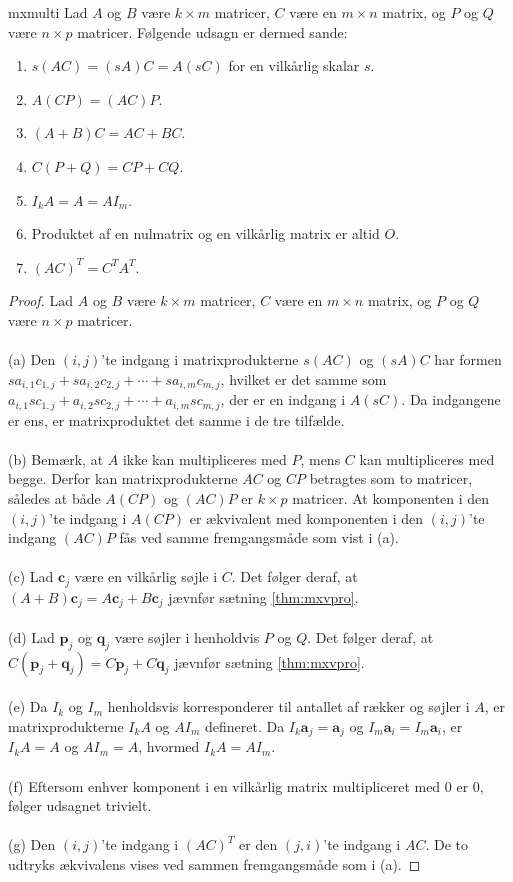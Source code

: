 \begin{thm}{}{mxmulti}
Lad $A$ og $B$ være $k \times m$ matricer, $C$ være en $m \times n$ matrix, og $P$ og $Q$ være $n \times p$ matricer. Følgende udsagn er dermed sande:
\begin{enumerate}[label=(\alph*)]
\item $s(AC)=(sA)C=A(sC)$ for en vilkårlig skalar $s$.
\item $A(CP)=(AC)P$.
\item $(A+B)C=AC+BC$.
\item $C(P+Q)=CP+CQ$.
\item $I_kA=A=AI_m$.
\item Produktet af en nulmatrix og en vilkårlig matrix er altid $O$.
\item $(AC)^T=C^TA^T$.
\end{enumerate}
\end{thm}
\begin{proof}
Lad $A$ og $B$ være $k \times m$ matricer, $C$ være en $m \times n$ matrix, og $P$ og $Q$ være $n \times p$ matricer. 
\\\\
(a) Den $(i,j)$'te indgang i matrixprodukterne $s(AC)$ og $(sA)C$ har formen $sa_{i,1}c_{1,j} + sa_{i,2}c_{2,j} + \cdots + sa_{i,m}c_{m,j}$, hvilket er det samme som $a_{i,1}sc_{1,j} + a_{i,2}sc_{2,j} + \cdots + a_{i,m}sc_{m,j}$, der er en indgang i $A(sC)$. 
Da indgangene er ens, er matrixproduktet det samme i de tre tilfælde.
\\\\
(b) Bemærk, at $A$ ikke kan multipliceres med $P$, mens $C$ kan multipliceres med begge. 
Derfor kan matrixprodukterne $AC$ og $CP$ betragtes som to matricer, således at både $A(CP)$ og $(AC)P$ er $k \times p$ matricer. 
At komponenten i den $(i,j)$'te indgang i $A(CP)$ er ækvivalent med komponenten i den $(i,j)$'te indgang $(AC)P$ fås ved samme fremgangsmåde som vist i (a). 
\\\\
(c) Lad $\textbf{c}_j$ være en vilkårlig søjle i $C$. 
Det følger deraf, at $(A+B)\textbf{c}_j=A\textbf{c}_j+B\textbf{c}_j$ jævnfør sætning \ref{thm:mxvpro}. 
\\\\
(d) Lad $\textbf{p}_j$ og $\textbf{q}_j$ være søjler i henholdvis $P$ og $Q$. Det følger deraf, at $C(\textbf{p}_j+\textbf{q}_j)=C\textbf{p}_j+C\textbf{q}_j$ jævnfør sætning \ref{thm:mxvpro}. 
\\\\
(e) Da $I_k$ og $I_m$ henholdsvis korresponderer til antallet af rækker og søjler i $A$, er matrixprodukterne $I_kA$ og $AI_m$ defineret. 
Da $I_k\textbf{a}_j=\textbf{a}_j$ og $I_m\textbf{a}_i=I_m\textbf{a}_i$, er $I_kA=A$ og $AI_m=A$, hvormed $I_kA=AI_m$.
\\\\
(f) Eftersom enhver komponent i en vilkårlig matrix multipliceret med $0$ er $0$, følger udsagnet trivielt. 
\\\\
(g) Den $(i,j)$'te indgang i $(AC)^T$ er den $(j,i)$'te indgang i $AC$. De to udtryks ækvivalens vises ved sammen fremgangsmåde som i (a).
\end{proof}
